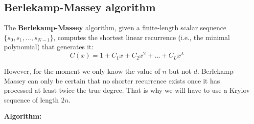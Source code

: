 \documentclass[a4paper, 11pt]{article}
\begin{document}
\subsection{Berlekamp-Massey algorithm}

The \textbf{Berlekamp-Massey} algorithm, given a finite-length scalar sequence $\{s_0,s_1,\dots,s_{N-1}\}$, computes the shortest linear recurrence (i.e., the minimal polynomial) that generates it:
\begin{equation}
    C(x) = 1 + C_1x + C_2x^2 + \dots + C_Lx^L
\end{equation}

However, for the moment we only know the value of $n$ but not $d$. Berlekamp-Massey can only be certain that no shorter recurrence exists once it has processed at least twice the true degree. That is why we will have to use a Krylov sequence of length $2n$.

\textbf{Algorithm:}
\end{document}

